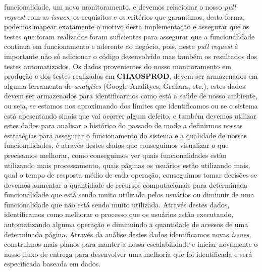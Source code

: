       funcionalidade, um novo monitoramento, e devemos relacionar o nosso
      \textit{pull request} com as \textit{issues}, os requisitos e os critérios
      que garantimos, desta forma, podemos mapear exatamente o motivo desta
      implementação e assegurar que os testes que foram realizados foram suficientes
      para assegurar que a funcionalidade continua em funcionamento e aderente ao
      negócio, pois, neste \textit{pull request} é importante não só adicionar o
      código desenvolvido mas também os resultados dos testes automatizados. \newline
      Os dados provenientes do nosso monitoramento em produção e dos testes
      realizados em \textbf{CHAOSPROD}, devem ser armazenados em alguma ferramenta
      de \textit{analytics} (Google Analitycs, Grafana, etc.), estes dados
      devem ser armazenados para identificarmos como está a saúde de nosso
      ambiente, ou seja, se estamos nos aproximando dos limites que identificamos
      ou se o sistema está apesentando sinais que vai ocorrer algum defeito, e
      também devemos utilizar estes dados para analisar o histórico do passado
      de modo a definirmos nossas estratégias para assegurar o funcionamento do
      sistema e a qualidade de nossas funcionalidades, é através destes dados
      que conseguimos visualizar o que precisamos melhorar, como conseguimos ver
      quais funcionalidades estão utilizando mais processamento, quais páginas os
      usuários estão utilizando mais, qual o tempo de resposta médio de cada operação,
      conseguimos tomar decisões se devemos aumentar a quantidade de recursos
      computacionais para determinada funcionalidade que está sendo muito utilizada
      pelos usuários ou diminuir de uma funcionalidade que não está sendo muito
      utilizada. Através destes dados, identificamos como melhorar o processo que
      os usuários estão executando, automatizando alguma operação e diminuindo a
      quantidade de acessos de uma determinada página. Através da análise destes dados
      identificamos novas \textit{issues}, construimos mais planos para manter
      a nossa escalabilidade e iniciar novamente o nosso fluxo de entrega para
      desenvolver uma melhoria que foi identificada e será específicada baseada
      em dados.

